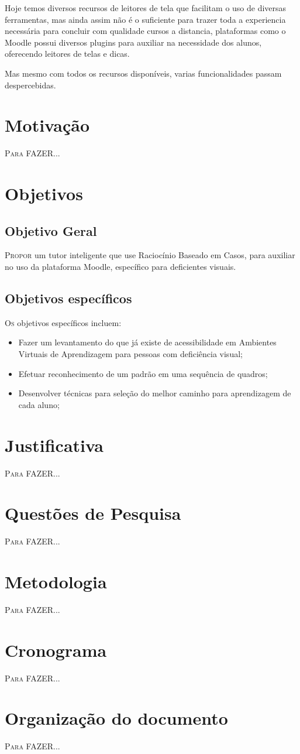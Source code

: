 Hoje temos diversos recursos de leitores de tela que facilitam o uso de diversas ferramentas, mas ainda assim não é o suficiente para trazer toda a experiencia necessária para concluir com qualidade cursos a distancia, plataformas como o Moodle possui diversos plugins para auxiliar na necessidade dos alunos, oferecendo leitores de telas e dicas.

Mas mesmo com todos os recursos disponíveis, varias funcionalidades passam despercebidas.

\section{Motivação}
\lettrine{P}{ara} FAZER...

\section{Objetivos}

\subsection{Objetivo Geral}
\lettrine{P}{ropor} um tutor inteligente que use Raciocínio Baseado em Casos, para auxiliar
no uso da plataforma Moodle, específico para deficientes visuais.

\subsection{Objetivos específicos}
\lettrine{O}{s} objetivos específicos incluem:
\begin{itemize}
    \item Fazer um levantamento do que já existe de acessibilidade em Ambientes Virtuais de Aprendizagem para pessoas com deficiência visual;
    \item Efetuar reconhecimento de um padrão em uma sequência de quadros;
    \item Desenvolver técnicas para seleção do melhor caminho para aprendizagem
    de cada aluno;
\end{itemize}

\section{Justificativa}
\lettrine{P}{ara} FAZER...

\section{Questões de Pesquisa}
\lettrine{P}{ara} FAZER...

\section{Metodologia}
\lettrine{P}{ara} FAZER...

\section{Cronograma}
\lettrine{P}{ara} FAZER...

\section{Organização do documento}
\lettrine{P}{ara} FAZER...